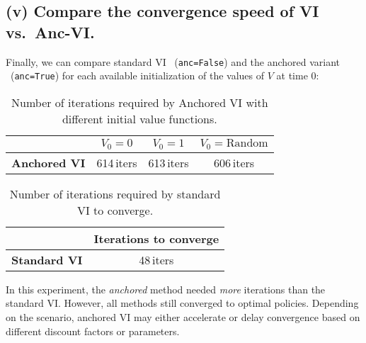 \subsection*{(v) Compare the convergence speed of VI vs.\ Anc-VI.}

\noindent
Finally, we can compare standard VI \ (\texttt{anc=False}) and the anchored variant 
\ (\texttt{anc=True}) for each available initialization of the values of $V$ at time $0$:
\begin{table}[H]
  \centering
  \begin{tabular}{l|c|c|c}
  \hline
   & \textbf{$V_0 = 0$} & \textbf{$V_0 = 1$} & \textbf{$V_0 = \mathrm{Random}$} \\
  \hline
  \textbf{Anchored VI} & 614\,iters & 613\,iters & 606\,iters \\
  \hline
  \end{tabular}
  \caption{Number of iterations required by Anchored VI with different initial value functions.}
  \label{tab:anchored-vi}
\end{table}
\begin{table}[H]
  \centering
  \begin{tabular}{l|c}
  \hline
   & \textbf{Iterations to converge} \\
  \hline
  \textbf{Standard VI} & 48\,iters \\
  \hline
  \end{tabular}
  \caption{Number of iterations required by standard VI to converge.}
  \label{tab:standard-vi}
\end{table}

In this experiment, the \emph{anchored} method needed \emph{more} iterations 
than the standard VI.
However, all methods still converged to optimal policies. Depending on the scenario,
anchored VI may either accelerate or delay convergence based on different discount factors or parameters.